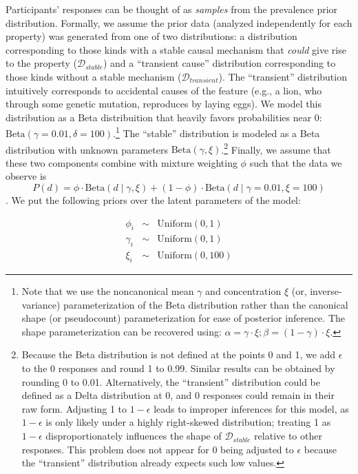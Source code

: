 \documentclass[english,floatsintext,man]{apa6}
\theoremstyle{definition}
\theoremstyle{definition}
\theoremstyle{definition}
\theoremstyle{remark}
\begin{document}
Participants' responses can be thought of as \emph{samples} from the
prevalence prior distribution. Formally, we assume the prior data
(analyzed independently for each property) was generated from one of two
distributions: a distribution corresponding to those kinds with a stable
causal mechanism that \emph{could} give rise to the property
(\(\mathcal{D}_{stable}\)) and a \enquote{transient cause} distribution
corresponding to those kinds without a stable mechanism
(\(\mathcal{D}_{transient}\)). The \enquote{transient} distribution
intuitively corresponds to accidental causes of the feature (e.g., a
lion, who through some genetic mutation, reproduces by laying eggs). We
model this distribution as a Beta distribuition that heavily favors
probabilities near 0:
\(\text{Beta}(\gamma = 0.01, \delta = 100)\).\footnote{Note that we use
  the noncanonical mean \(\gamma\) and concentration \(\xi\) (or,
  inverse-variance) parameterization of the Beta distribution rather
  than the canonical shape (or pseudocount) parameterization for ease of
  posterior inference. The shape parameterization can be recovered
  using: \(\alpha = \gamma \cdot \xi; \beta = (1 - \gamma) \cdot \xi\).}
The \enquote{stable} distribution is modeled as a Beta distribution with
unknown parameters \(\text{Beta}(\gamma, \xi)\).\footnote{Because the
  Beta distribution is not defined at the points 0 and 1, we add
  \(\epsilon\) to the 0 responses and round 1 to 0.99. Similar results
  can be obtained by rounding 0 to 0.01. Alternatively, the
  \enquote{transient} distribution could be defined as a Delta
  distribution at 0, and 0 responses could remain in their raw form.
  Adjusting 1 to \(1- \epsilon\) leads to improper inferences for this
  model, as \(1 - \epsilon\) is only likely under a highly right-skewed
  distribution; treating 1 as \(1- \epsilon\) disproportionately
  influences the shape of \(\mathcal{D}_{stable}\) relative to other
  responses. This problem does not appear for 0 being adjusted to
  \(\epsilon\) because the \enquote{transient} distribution already
  expects such low values.} Finally, we assume that these two components
combine with mixture weighting \(\phi\) such that the data we observe is
\[P(d) = \phi\cdot \text{Beta} (d \mid \gamma, \xi) + (1 -  \phi) \cdot \text{Beta}(d \mid \gamma = 0.01, \xi = 100) \].
We put the following priors over the latent parameters of the model:

\begin{eqnarray*}
\phi_i & \sim & \text{Uniform}(0, 1) \\
\gamma_i & \sim & \text{Uniform}(0, 1) \\
\xi_i & \sim & \text{Uniform}(0, 100)
\end{eqnarray*}
\end{document}
